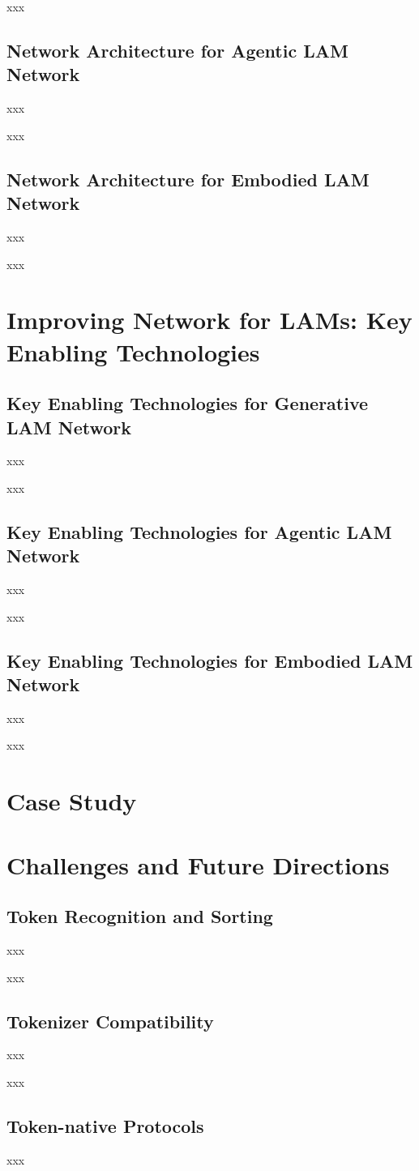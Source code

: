 \documentclass[lettersize,journal]{IEEEtran}
\begin{document}
xxx
\subsection{Network Architecture for Agentic LAM Network}
xxx

xxx
\subsection{Network Architecture for Embodied LAM Network}
xxx

xxx

\section{Improving Network for LAMs: Key Enabling Technologies}
\subsection{Key Enabling Technologies for Generative LAM Network}
xxx

xxx
\subsection{Key Enabling Technologies for Agentic LAM Network}
xxx

xxx
\subsection{Key Enabling Technologies for Embodied LAM Network}
xxx

xxx

\section{Case Study}

\section{Challenges and Future Directions}
\subsection{Token Recognition and Sorting}
xxx

xxx
\subsection{Tokenizer Compatibility}
xxx

xxx
\subsection{Token-native Protocols}
xxx
\end{document}

